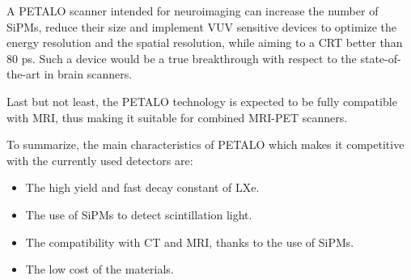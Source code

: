\documentclass[review]{elsarticle}
\begin{document}
A PETALO scanner intended for neuroimaging can increase the number of SiPMs, reduce their size and implement VUV sensitive devices to optimize the energy resolution and the spatial resolution, while aiming to a  CRT  better than 80 ps. Such a device would be a true breakthrough with respect to the state-of-the-art in brain scanners. 

Last but not least, the PETALO technology is expected to be fully compatible with MRI, thus making it suitable for combined MRI-PET scanners. 

To summarize, the main characteristics of PETALO which makes it competitive with the currently used detectors are:

\begin{itemize}
\item The high yield and fast decay constant of LXe.
\item The use of SiPMs to detect scintillation light.
\item The compatibility with CT and MRI, thanks to the use of SiPMs.
\item The low cost of the materials.
\end{itemize}



\section*{}


\end{document}
